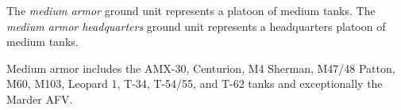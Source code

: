 
The \emph{medium armor} ground unit represents a platoon of medium tanks.
The \emph{medium armor headquarters} ground unit represents a headquarters platoon of medium tanks.

Medium armor includes the AMX-30, Centurion, M4 Sherman, M47/48 Patton, M60, M103, Leopard 1, T-34, T-54/55, and T-62 tanks and exceptionally the Marder AFV.

